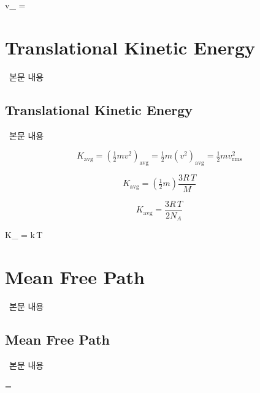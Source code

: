\begin{eqbox} v_{} = 
\label{eq:root-mean-square_speed} \end{eqbox}

\section{Translational Kinetic Energy}
%
\ 본문 내용

\subsection{Translational Kinetic Energy}
%
\ 본문 내용

\begin{equation} K_{\text{avg}} = \left( \tfrac{1}{2}mv^2 \right)_{\text{avg}} = \tfrac{1}{2}m (v^2)_{\text{avg}} = \tfrac{1}{2}m v_{\text{rms}}^2 \end{equation}

\begin{equation*} K_{\text{avg}} = \left( \tfrac{1}{2}m \right) \frac{3R\,T}{M} \end{equation*}

\begin{equation*} K_{\text{avg}} = \frac{3R\,T}{2N_A} \end{equation*}

\begin{eqbox} K_{} = k\,T
\label{eq:average_translational_kinetic_energy} \end{eqbox}

\section{Mean Free Path}
%
\ 본문 내용

\subsection{Mean Free Path}
%
\ 본문 내용

\begin{eqbox} \lambda =  ~~~~~ 
\label{eq:mean_free_path} \end{eqbox}

